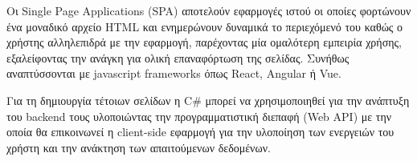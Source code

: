 Οι Single Page Applications (SPA) αποτελούν εφαρμογές ιστού οι οποίες φορτώνουν ένα μοναδικό αρχείο HTML
και ενημερώνουν δυναμικά το περιεχόμενό του καθώς ο χρήστης αλληλεπιδρά με την εφαρμογή, παρέχοντας
μία ομαλότερη εμπειρία χρήσης, εξαλείφοντας την ανάγκη για ολική επαναφόρτωση της σελίδας. Συνήθως αναπτύσσονται
με javascript frameworks όπως React, Angular ή Vue.

Για τη δημιουργία τέτοιων σελίδων η C\# μπορεί να χρησιμοποιηθεί για την ανάπτυξη του backend τους υλοποιώντας
την προγραμματιστική διεπαφή (Web API) με την οποία θα επικοινωνεί η client-side εφαρμογή για την υλοποίηση
των ενεργειών του χρήστη και την ανάκτηση των απαιτούμενων δεδομένων.